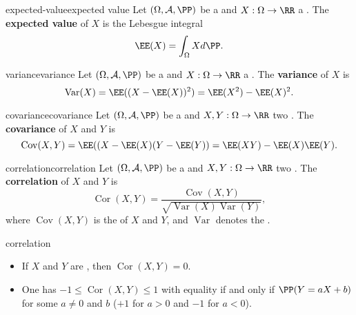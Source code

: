 \begin{topic}{expected-value}{expected value}
    Let $(\Omega, \mathcal{A}, \PP)$ be a  and $X : \Omega \to \RR$ a . The \textbf{expected value} of $X$ is the Lebesgue integral
    \[ \EE(X) = \int_\Omega X d \PP . \]
\end{topic}

\begin{topic}{variance}{variance}
    Let $(\Omega, \mathcal{A}, \PP)$ be a  and $X : \Omega \to \RR$ a . The \textbf{variance} of $X$ is
    \[ \operatorname{Var}(X) = \EE((X - \EE(X))^2) = \EE(X^2) - \EE(X)^2 . \]
\end{topic}

\begin{topic}{covariance}{covariance}
    Let $(\Omega, \mathcal{A}, \PP)$ be a  and $X, Y : \Omega \to \RR$ two . The \textbf{covariance} of $X$ and $Y$ is
    \[ \operatorname{Cov}(X, Y) = \EE((X - \EE(X) (Y - \EE(Y)) = \EE(XY) - \EE(X) \EE(Y) . \]
\end{topic}

\begin{topic}{correlation}{correlation}
    Let $(\Omega, \mathcal{A}, \PP)$ be a  and $X, Y : \Omega \to \RR$ two . The \textbf{correlation} of $X$ and $Y$ is
    \[ \operatorname{Cor}(X, Y) = \frac{\operatorname{Cov}(X, Y)}{\sqrt{\operatorname{Var}(X) \operatorname{Var}(Y)}} , \]
    where $\operatorname{Cov}(X, Y)$ is the  of $X$ and $Y$, and $\operatorname{Var}$ denotes the .
\end{topic}

\begin{example}{correlation}
    \begin{itemize}
        \item If $X$ and $Y$ are , then $\operatorname{Cor}(X, Y) = 0$.
        \item One has $-1 \le \operatorname{Cor}(X, Y) \le 1$ with equality if and only if $\PP(Y = a X + b)$ for some $a \ne 0$ and $b$ ($+1$ for $a > 0$ and $-1$ for $a < 0$).
    \end{itemize}
\end{example}

